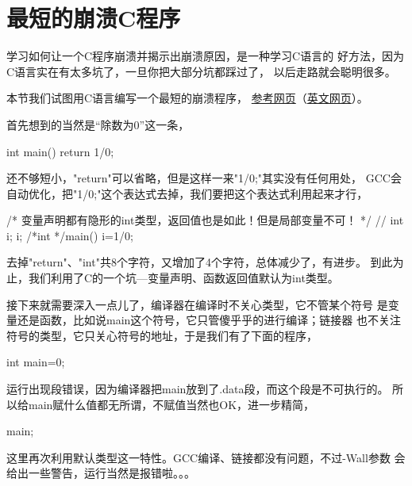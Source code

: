 ﻿\section[最短的崩溃C程序]{最短的崩溃C程序}
学习如何让一个C程序崩溃并揭示出崩溃原因，是一种学习C语言的
好方法，因为C语言实在有太多坑了，一旦你把大部分坑都踩过了，
以后走路就会聪明很多。

本节我们试图用C语言编写一个最短的崩溃程序，
\href{http://blog.jobbole.com/40286/}{参考网页}（\href{http://llbit.se/?p=1744}{英文网页}）。

首先想到的当然是“除数为0”这一条，

\begin{cppcode}
int main()
{
  return 1/0;
}
\end{cppcode}

还不够短小，"return"可以省略，但是这样一来"1/0;"其实没有任何用处，
GCC会自动优化，把"1/0;"这个表达式去掉，我们要把这个表达式利用起来才行，

\begin{cppcode}
/* 变量声明都有隐形的int类型，返回值也是如此！但是局部变量不可！ */
// int i;
i;
/*int */main()
{
  i=1/0;
}
\end{cppcode}

去掉"return"、"int"共8个字符，又增加了4个字符，总体减少了，有进步。
到此为止，我们利用了C的一个坑---变量声明、函数返回值默认为int类型。

接下来就需要深入一点儿了，编译器在编译时不关心类型，它不管某个符号
是变量还是函数，比如说main这个符号，它只管傻乎乎的进行编译；链接器
也不关注符号的类型，它只关心符号的地址，于是我们有了下面的程序，

\begin{cppcode}
int main=0;
\end{cppcode}

运行出现段错误，因为编译器把main放到了.data段，而这个段是不可执行的。
所以给main赋什么值都无所谓，不赋值当然也OK，进一步精简，

\begin{cppcode}
main;
\end{cppcode}

这里再次利用默认类型这一特性。GCC编译、链接都没有问题，不过-Wall参数
会给出一些警告，运行当然是报错啦。。。